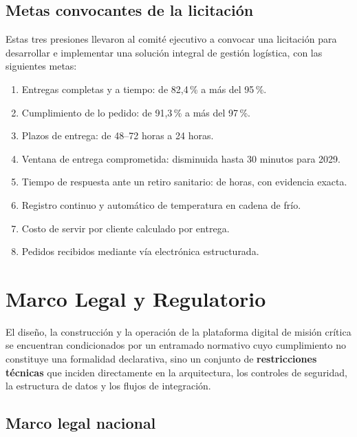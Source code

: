 \subsection{Metas convocantes de la licitación}

Estas tres presiones llevaron al comité ejecutivo a convocar una licitación para
desarrollar e implementar una solución integral de gestión logística, con las siguientes
metas:

\begin{enumerate}
  \item Entregas completas y a tiempo: de 82,4\,\% a más del 95\,\%.
  \item Cumplimiento de lo pedido: de 91,3\,\% a más del 97\,\%.
  \item Plazos de entrega: de 48--72 horas a 24 horas.
  \item Ventana de entrega comprometida: disminuida hasta 30 minutos para 2029.
  \item Tiempo de respuesta ante un retiro sanitario: de horas, con evidencia exacta.
  \item Registro continuo y automático de temperatura en cadena de frío.
  \item Costo de servir por cliente calculado por entrega.
  \item Pedidos recibidos mediante vía electrónica estructurada.
\end{enumerate}

\section{Marco Legal y Regulatorio}

El diseño, la construcción y la operación de la plataforma digital de misión crítica se
encuentran condicionados por un entramado normativo cuyo cumplimiento no constituye una
formalidad declarativa, sino un conjunto de \textbf{restricciones técnicas} que inciden
directamente en la arquitectura, los controles de seguridad, la estructura de datos y los
flujos de integración.

\subsection{Marco legal nacional}

